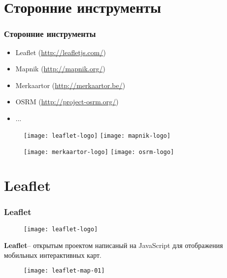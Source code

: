 \section{Сторонние инструменты}
\begin{frame}
    \frametitle{Сторонние инструменты}
    \begin{itemize}
        \item Leaflet (\url{http://leafletjs.com/})
        \item Mapnik (\url{http://mapnik.org/})
        \item Merkaartor (\url{http://merkaartor.be/})
        \item OSRM (\url{http://project-osrm.org/})
        \item ...\footnotemark
    \end{itemize}
    \begin{figure}[ht!]
        \texttt{[image: leaflet-logo]}\quad
        \texttt{[image: mapnik-logo]}
    \end{figure}
    \begin{figure}[ht!]
        \texttt{[image: merkaartor-logo]}\quad
        \texttt{[image: osrm-logo]}
    \end{figure}
\end{frame}

\section{Leaflet}
\begin{frame}
    \frametitle{Leaflet}
    \begin{figure}[ht!]
        \texttt{[image: leaflet-logo]}
    \end{figure}
    \textbf{Leaflet}\footnotemark -- открытым проектом написаный на 
    JavaScript для отображения мобильных интерактивных карт.
    \begin{figure}[ht!]
        \texttt{[image: leaflet-map-01]}
        \footnotemark
    \end{figure}
\end{frame}

